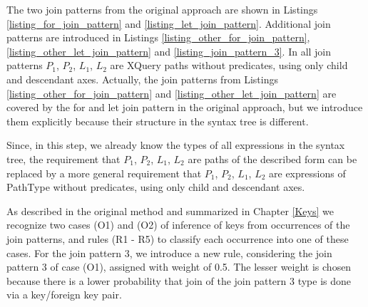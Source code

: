 The two join patterns from the original approach are shown in Listings \ref{listing_for_join_pattern} and \ref{listing_let_join_pattern}. Additional join patterns are introduced in Listings \ref{listing_other_for_join_pattern}, \ref{listing_other_let_join_pattern} and \ref{listing_join_pattern_3}. In all join patterns $P_1$, $P_2$, $L_1$, $L_2$ are XQuery paths without predicates, using only child and descendant axes. Actually, the join patterns from Listings \ref{listing_other_for_join_pattern} and \ref{listing_other_let_join_pattern} are covered by the for and let join pattern in the original approach, but we introduce them explicitly because their structure in the syntax tree is different.

Since, in this step, we already know the types of all expressions in the syntax tree, the requirement that $P_1$, $P_2$, $L_1$, $L_2$ are paths of the described form can be replaced by a more general requirement that $P_1$, $P_2$, $L_1$, $L_2$ are expressions of PathType without predicates, using only child and descendant axes.

As described in the original method and summarized in Chapter \ref{Keys} we recognize two cases (O1) and (O2) of inference of keys from occurrences of the join patterns, and rules (R1 - R5) to classify each occurrence into one of these cases. For the join pattern 3, we introduce a new rule, considering the join pattern 3 of case (O1), assigned with weight of 0.5.  The lesser weight is chosen because there is a lower probability that join of the join pattern 3 type is done via a key/foreign key pair.

